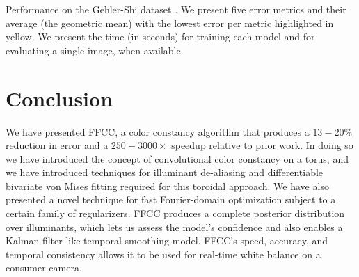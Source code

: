 \documentclass[10pt,twocolumn,letterpaper]{article}
\makeatletter
\newcommand\latinabbrev[1]{
  \peek_meaning:NTF . {%
    #1\@}%
  { \peek_catcode:NTF a {%
      #1.\@ }%
    {#1.\@}}}
\def\etal{\latinabbrev{et al}}
\makeatother
\begin{document}
\begin{table}[!]
\begin{center}
\vspace{1mm}
\caption{
Performance on the Gehler-Shi dataset \cite{Gehler08,shifunt}.
We present five error metrics and their average
(the geometric mean) with the lowest error per metric
highlighted in yellow.
We present the time (in seconds) for training each model and for
evaluating a single image, when available.
\label{table:gehler_shi}}
\vspace{5mm}
\vspace{1mm}
\caption{
 Performance on the dataset from Cheng \etal \cite{Cheng14}, in the same format as Table~\ref{table:gehler_shi}, excluding runtimes. As was done in \cite{BarronICCV2015} we present the
 average performance (the geometric mean) over all $8$ cameras in the dataset.
\label{table:cheng}}
\end{center}
\end{table}

\section{Conclusion}

We have presented FFCC, a color constancy algorithm that produces a $13-20\%$
reduction in error and a $250-3000\times$ speedup relative to prior work.
In doing so we have introduced the concept of convolutional color
constancy on a torus, and we have introduced techniques for illuminant de-aliasing and
differentiable bivariate von Mises fitting required for this toroidal approach.
We have also presented a novel technique for fast Fourier-domain
optimization subject to a certain family of regularizers.
FFCC produces a complete posterior distribution over illuminants,
which lets us assess the model's confidence and also enables a Kalman
filter-like temporal smoothing model.
FFCC's speed, accuracy, and temporal consistency allows it to be
used for real-time white balance on a consumer camera.

\clearpage

{\small


}
\end{document}

